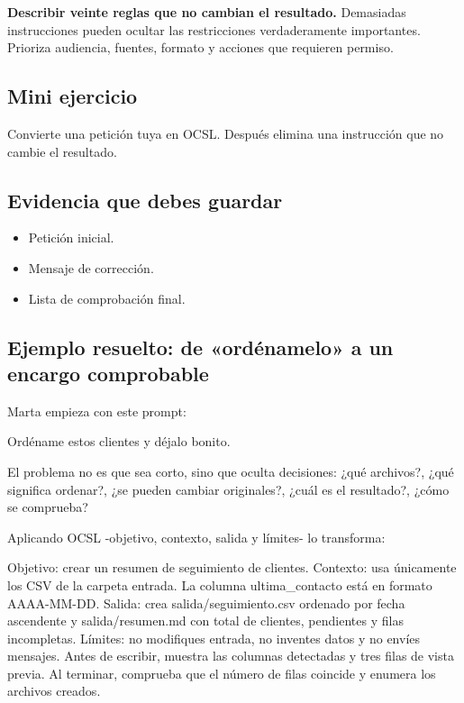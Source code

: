 \documentclass[10pt,a4paper,openany]{book}
\providecommand{\tightlist}{\setlength{\itemsep}{0.18em}\setlength{\parskip}{0pt}}
\newenvironment{Shaded}{}{}
\newcommand{\NormalTok}[1]{#1}
\renewenvironment{Shaded}
  {\begin{tcolorbox}[
    enhanced,
    breakable,
    colback=CodeBg,
    colframe=Border,
    boxrule=0.5pt,
    arc=2mm,
    left=3mm,
    right=3mm,
    top=2.2mm,
    bottom=2.2mm,
    before skip=0.8em,
    after skip=0.9em
  ]}
  {\end{tcolorbox}}
\begin{document}
\textbf{Describir veinte reglas que no cambian el resultado.} Demasiadas
instrucciones pueden ocultar las restricciones verdaderamente
importantes. Prioriza audiencia, fuentes, formato y acciones que
requieren permiso.

\subsection{Mini ejercicio}\label{mini-ejercicio-1}

Convierte una petición tuya en OCSL. Después elimina una instrucción que
no cambie el resultado.

\subsection{Evidencia que debes
guardar}\label{evidencia-que-debes-guardar-4}

\begin{itemize}
\tightlist
\item
  Petición inicial.
\item
  Mensaje de corrección.
\item
  Lista de comprobación final.
\end{itemize}

\subsection{Ejemplo resuelto: de «ordénamelo» a un encargo
comprobable}\label{ejemplo-resuelto-de-orduxe9namelo-a-un-encargo-comprobable}

Marta empieza con este prompt:

\begin{Shaded}
\begin{Highlighting}[]
\NormalTok{Ordéname estos clientes y déjalo bonito.}
\end{Highlighting}
\end{Shaded}

El problema no es que sea corto, sino que oculta decisiones: ¿qué
archivos?, ¿qué significa ordenar?, ¿se pueden cambiar originales?,
¿cuál es el resultado?, ¿cómo se comprueba?

Aplicando OCSL -objetivo, contexto, salida y límites- lo transforma:

\begin{Shaded}
\begin{Highlighting}[]
\NormalTok{Objetivo: crear un resumen de seguimiento de clientes.}
\NormalTok{Contexto: usa únicamente los CSV de la carpeta entrada. La columna}
\NormalTok{ultima\_contacto está en formato AAAA{-}MM{-}DD.}
\NormalTok{Salida: crea salida/seguimiento.csv ordenado por fecha ascendente y}
\NormalTok{salida/resumen.md con total de clientes, pendientes y filas incompletas.}
\NormalTok{Límites: no modifiques entrada, no inventes datos y no envíes mensajes.}
\NormalTok{Antes de escribir, muestra las columnas detectadas y tres filas de vista previa.}
\NormalTok{Al terminar, comprueba que el número de filas coincide y enumera los archivos creados.}
\end{Highlighting}
\end{Shaded}
\end{document}

